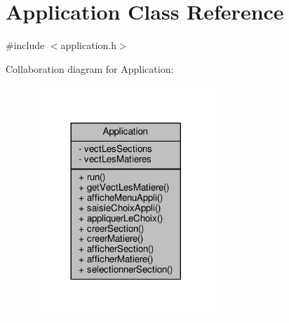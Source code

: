 \hypertarget{class_application}{\section{Application Class Reference}
\label{class_application}
}


{\ttfamily \#include $<$application.\+h$>$}



Collaboration diagram for Application\+:\nopagebreak
\begin{figure}[H]
\begin{center}
\leavevmode
\includegraphics[width=197pt]{class_application__coll__graph}
\end{center}
\end{figure}
